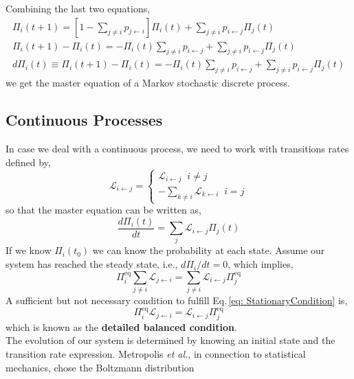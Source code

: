 Combining the last two equations,
\begin{align}
    \Pi_{i}(t+1) = \left[1 - \sum_{j\neq i}p_{j \leftarrow i}\right]\Pi_{i}(t) + \sum_{j\neq i}p_{i \leftarrow j}\Pi_{j}(t)\\
    \Pi_{i}(t+1) - \Pi_{i}(t) = -\Pi_{i}(t) \sum_{j \neq i}p_{i \leftarrow j} + \sum_{j \neq i} p_{i \leftarrow j}\Pi_{j}(t) \\
    \label{eq: MasterEquationDiscrete}
    d\Pi_{i}(t) \equiv \Pi_{i}(t+1) - \Pi_{i}(t) =  -\Pi_{i}(t) \sum_{j \neq i}p_{i \leftarrow j} + \sum_{j \neq i} p_{i \leftarrow j}\Pi_{j}(t)
\end{align}
we get the master equation of a Markov stochastic discrete process.
\subsection{Continuous Processes}
In case we deal with a continuous process, we need to work with transitions rates defined by,
\begin{equation}
    \mathcal{L}_{i \leftarrow j} = 
    \begin{cases}
    \mathcal{L}_{i \leftarrow j} \;\; i\neq j\\
    -\sum_{k\neq i}\mathcal{L}_{k \leftarrow i} \;\; i = j
    \end{cases}
\end{equation}
so that the master equation can be written as,
\begin{equation}
\label{eq: MasterEquationContinuous}
    \frac{d\Pi_{i}(t)}{dt} = \sum_{j}\mathcal{L}_{i \leftarrow j} \Pi_{j}(t)
\end{equation}
If we know $\Pi_{i}(t_{0})$ we can know the probability at each state. Assume our system has reached the steady state, i.e., $d\Pi_{i}/dt = 0$, which implies,
\begin{equation}
\label{eq: StationaryCondition}
    \Pi_{i}^{\mathrm{eq}} \sum_{j\neq i} \mathcal{L}_{j \leftarrow i} = \sum_{j \neq i}\mathcal{L}_{i \leftarrow j}\Pi_{j}^{\mathrm{eq}} 
\end{equation}
A sufficient but not necessary condition to fulfill Eq.\,\eqref{eq: StationaryCondition} is,
\begin{equation}
    \Pi_{i}^{\mathrm{eq}}\mathcal{L}_{j \leftarrow i} = \mathcal{L}_{i \leftarrow j}\Pi_{j}^{\mathrm{eq}} 
\end{equation}
which is known as the \textbf{detailed balanced condition}.\\
The evolution of our system is determined by knowing an initial state and the transition rate expression. Metropolis \textit{et al.}, in connection to statistical mechanics, chose the Boltzmann distribution
